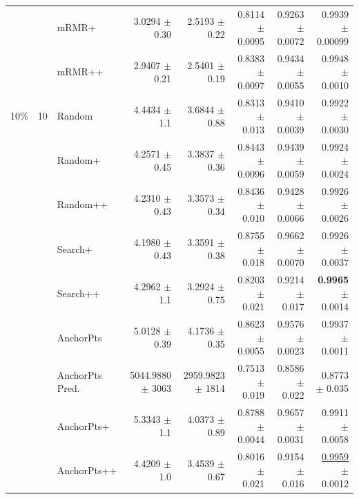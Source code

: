 \begin{longtable}{llp{}rrrrr}
 &  & mRMR+ & 3.0294 {\scriptsize $\pm$ 0.30} & 2.5193 {\scriptsize $\pm$ 0.22} & 0.8114 {\scriptsize $\pm$ 0.0095} & 0.9263 {\scriptsize $\pm$ 0.0072} & 0.9939 {\scriptsize $\pm$ 0.00099} \\
 &  & mRMR++ & 2.9407 {\scriptsize $\pm$ 0.21} & 2.5401 {\scriptsize $\pm$ 0.19} & 0.8383 {\scriptsize $\pm$ 0.0097} & 0.9434 {\scriptsize $\pm$ 0.0055} & 0.9948 {\scriptsize $\pm$ 0.0010} \\
\midrule
10\% & 10 & Random & 4.4434 {\scriptsize $\pm$ 1.1} & 3.6844 {\scriptsize $\pm$ 0.88} & 0.8313 {\scriptsize $\pm$ 0.013} & 0.9410 {\scriptsize $\pm$ 0.0039} & 0.9922 {\scriptsize $\pm$ 0.0030} \\
 &  & Random+ & 4.2571 {\scriptsize $\pm$ 0.45} & 3.3837 {\scriptsize $\pm$ 0.36} & 0.8443 {\scriptsize $\pm$ 0.0096} & 0.9439 {\scriptsize $\pm$ 0.0059} & 0.9924 {\scriptsize $\pm$ 0.0024} \\
 &  & Random++ & 4.2310 {\scriptsize $\pm$ 0.43} & 3.3573 {\scriptsize $\pm$ 0.34} & 0.8436 {\scriptsize $\pm$ 0.010} & 0.9428 {\scriptsize $\pm$ 0.0066} & 0.9926 {\scriptsize $\pm$ 0.0026} \\
 &  & Search+ & 4.1980 {\scriptsize $\pm$ 0.43} & 3.3591 {\scriptsize $\pm$ 0.38} & 0.8755 {\scriptsize $\pm$ 0.018} & 0.9662 {\scriptsize $\pm$ 0.0070} & 0.9926 {\scriptsize $\pm$ 0.0037} \\
 &  & Search++ & 4.2962 {\scriptsize $\pm$ 1.1} & 3.2924 {\scriptsize $\pm$ 0.75} & 0.8203 {\scriptsize $\pm$ 0.021} & 0.9214 {\scriptsize $\pm$ 0.017} & \textbf{0.9965} {\scriptsize $\pm$ 0.0014} \\
 &  & AnchorPts & 5.0128 {\scriptsize $\pm$ 0.39} & 4.1736 {\scriptsize $\pm$ 0.35} & 0.8623 {\scriptsize $\pm$ 0.0055} & 0.9576 {\scriptsize $\pm$ 0.0023} & 0.9937 {\scriptsize $\pm$ 0.0011} \\
 &  & AnchorPts Pred. & 5044.9880 {\scriptsize $\pm$ 3063} & 2959.9823 {\scriptsize $\pm$ 1814} & 0.7513 {\scriptsize $\pm$ 0.019} & 0.8586 {\scriptsize $\pm$ 0.022} & 0.8773 {\scriptsize $\pm$ 0.035} \\
 &  & AnchorPts+ & 5.3343 {\scriptsize $\pm$ 1.1} & 4.0373 {\scriptsize $\pm$ 0.89} & 0.8788 {\scriptsize $\pm$ 0.0044} & 0.9657 {\scriptsize $\pm$ 0.0031} & 0.9911 {\scriptsize $\pm$ 0.0058} \\
 &  & AnchorPts++ & 4.4209 {\scriptsize $\pm$ 1.0} & 3.4539 {\scriptsize $\pm$ 0.67} & 0.8016 {\scriptsize $\pm$ 0.021} & 0.9154 {\scriptsize $\pm$ 0.016} & \underline{0.9959} {\scriptsize $\pm$ 0.0012} \\

\end{longtable}
